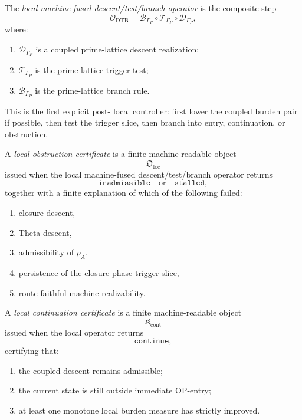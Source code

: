 \begin{definition}
\label{def:local-machine-fused-descent-test-branch-operator}
The \emph{local machine-fused descent/test/branch operator} is the composite step
\[
\mathcal{O}_{\mathrm{DTB}}
=
\mathcal{B}_{\Gamma_P}
\circ
\mathcal{T}_{\Gamma_P}
\circ
\mathcal{D}_{\Gamma_P},
\]
where:
\begin{enumerate}
 \item $\mathcal{D}_{\Gamma_P}$ is a coupled prime-lattice descent realization;
 \item $\mathcal{T}_{\Gamma_P}$ is the prime-lattice trigger test;
 \item $\mathcal{B}_{\Gamma_P}$ is the prime-lattice branch rule.
\end{enumerate}
\end{definition}

\begin{remark}
\label{rem:operational-reading-local-operator}
This is the first explicit post- local controller:
first lower the coupled burden pair if possible,
then test the trigger slice,
then branch into entry, continuation, or obstruction.
\end{remark}

\begin{definition}
\label{def:local-obstruction-certificate}
A \emph{local obstruction certificate} is a finite machine-readable object
\[
\mathfrak{O}_{\mathrm{loc}}
\]
issued when the local machine-fused descent/test/branch operator returns
\[
\mathtt{inadmissible}
\quad\text{or}\quad
\mathtt{stalled},
\]
together with a finite explanation of which of the following failed:
\begin{enumerate}
 \item closure descent,
 \item Theta descent,
 \item admissibility of $\rho_A$,
 \item persistence of the closure-phase trigger slice,
 \item route-faithful machine realizability.
\end{enumerate}
\end{definition}

\begin{definition}
\label{def:local-continuation-certificate}
A \emph{local continuation certificate} is a finite machine-readable object
\[
\mathfrak{K}_{\mathrm{cont}}
\]
issued when the local operator returns
\[
\mathtt{continue},
\]
certifying that:
\begin{enumerate}
 \item the coupled descent remains admissible;
 \item the current state is still outside immediate OP-entry;
 \item at least one monotone local burden measure has strictly improved.
\end{enumerate}
\end{definition}

